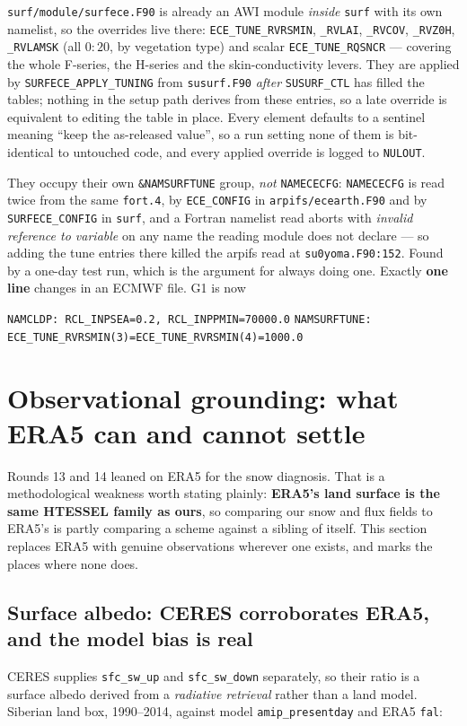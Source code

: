 \documentclass[10pt]{article}
\begin{document}
\texttt{surf/module/surfece.F90} is already an AWI module \emph{inside} \texttt{surf} with its
own namelist, so the overrides live there: \texttt{ECE\_TUNE\_RVRSMIN}, \texttt{\_RVLAI},
\texttt{\_RVCOV}, \texttt{\_RVZ0H}, \texttt{\_RVLAMSK} (all $0{:}20$, by vegetation type) and
scalar \texttt{ECE\_TUNE\_RQSNCR} --- covering the whole F-series, the H-series and the
skin-conductivity levers. They are applied by \texttt{SURFECE\_APPLY\_TUNING} from
\texttt{susurf.F90} \emph{after} \texttt{SUSURF\_CTL} has filled the tables; nothing in the
setup path derives from these entries, so a late override is equivalent to editing the table
in place. Every element defaults to a sentinel meaning ``keep the as-released value'', so a
run setting none of them is bit-identical to untouched code, and every applied override is
logged to \texttt{NULOUT}.

They occupy their own \texttt{\&NAMSURFTUNE} group, \emph{not} \texttt{NAMECECFG}:
\texttt{NAMECECFG} is read twice from the same \texttt{fort.4}, by \texttt{ECE\_CONFIG} in
\texttt{arpifs/ecearth.F90} and by \texttt{SURFECE\_CONFIG} in \texttt{surf}, and a Fortran
namelist read aborts with \emph{invalid reference to variable} on any name the reading module
does not declare --- so adding the tune entries there killed the arpifs read at
\texttt{su0yoma.F90:152}. Found by a one-day test run, which is the argument for always doing
one. Exactly \textbf{one line} changes in an ECMWF file. G1 is now

\begin{center}\footnotesize
\texttt{NAMCLDP: RCL\_INPSEA=0.2, RCL\_INPPMIN=70000.0} \quad
\texttt{NAMSURFTUNE: ECE\_TUNE\_RVRSMIN(3)=ECE\_TUNE\_RVRSMIN(4)=1000.0}
\end{center}

\section{Observational grounding: what ERA5 can and cannot settle}\label{sec:obs}
Rounds 13 and 14 leaned on ERA5 for the snow diagnosis. That is a methodological
weakness worth stating plainly: \textbf{ERA5's land surface is the same HTESSEL family
as ours}, so comparing our snow and flux fields to ERA5's is partly comparing a scheme
against a sibling of itself. This section replaces ERA5 with genuine observations
wherever one exists, and marks the places where none does.

\subsection{Surface albedo: CERES corroborates ERA5, and the model bias is real}\label{sub:ceresalb}
CERES supplies \texttt{sfc\_sw\_up} and \texttt{sfc\_sw\_down} separately, so their ratio
is a surface albedo derived from a \emph{radiative retrieval} rather than a land model.
Siberian land box, 1990--2014, against model \texttt{amip\_presentday} and ERA5
\texttt{fal}:
\end{document}
